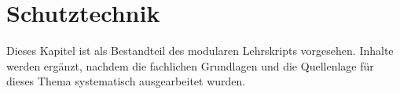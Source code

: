 \chapter{Schutztechnik}
\label{chap:11-schutztechnik}

Dieses Kapitel ist als Bestandteil des modularen Lehrskripts vorgesehen.
Inhalte werden ergänzt, nachdem die fachlichen Grundlagen und die
Quellenlage für dieses Thema systematisch ausgearbeitet wurden.
